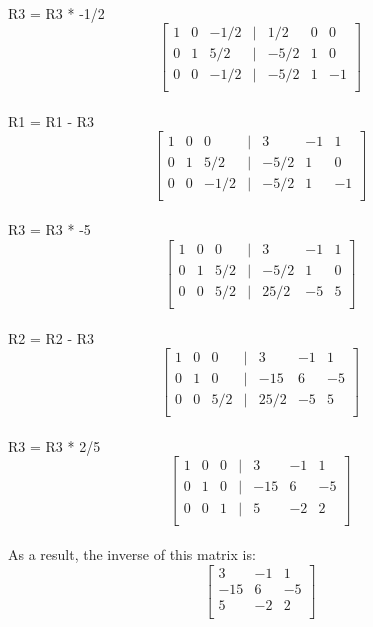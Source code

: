 \documentclass[a4paper,12pt]{article} %
\begin{document}
\\
R3 = R3 * -1/2
\[
\begin{bmatrix}
    1 & 0 & -1/2 & | & 1/2 & 0 & 0 \\
    0 & 1 & 5/2 & | & -5/2 & 1 & 0 \\
    0 & 0 & -1/2 & | & -5/2 & 1 & -1 \\
\end{bmatrix}
\]
\\
R1 = R1 - R3
\[
\begin{bmatrix}
    1 & 0 & 0 & | & 3 & -1 & 1 \\
    0 & 1 & 5/2 & | & -5/2 & 1 & 0 \\
    0 & 0 & -1/2 & | & -5/2 & 1 & -1 \\
\end{bmatrix}
\]
\\
R3 = R3 * -5
\[
\begin{bmatrix}
    1 & 0 & 0 & | & 3 & -1 & 1 \\
    0 & 1 & 5/2 & | & -5/2 & 1 & 0 \\
    0 & 0 & 5/2 & | & 25/2 & -5 & 5 \\
\end{bmatrix}
\]
\\
R2 = R2 - R3
\[
\begin{bmatrix}
    1 & 0 & 0 & | & 3 & -1 & 1 \\
    0 & 1 & 0 & | & -15 & 6 & -5 \\
    0 & 0 & 5/2 & | & 25/2 & -5 & 5 \\
\end{bmatrix}
\]
\\
R3 = R3 * 2/5
\[
\begin{bmatrix}
    1 & 0 & 0 & | & 3 & -1 & 1 \\
    0 & 1 & 0 & | & -15 & 6 & -5 \\
    0 & 0 & 1 & | & 5 & -2 & 2 \\
\end{bmatrix}
\]
\\
As a result, the inverse of this matrix is: \\
\[
\begin{bmatrix}
    3 & -1 & 1 \\
    -15 & 6 & -5 \\
    5 & -2 & 2 \\
\end{bmatrix}
\]
\\
\end{document}
